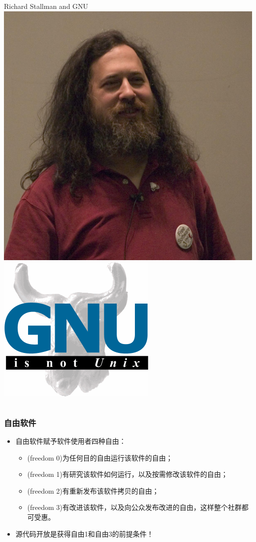 \documentclass[xcolor=svgnames,presentation]{beamer}
\begin{document}
\begin{frame}
\begin{columns}
\begin{column}{0.5\textwidth}
\begin{exampleblock}{Richard Stallman and GNU}
\includegraphics[width=.5\textwidth]{img/stallman.jpg}
\includegraphics[width=.5\textwidth]{img/gnu.jpg}
\end{exampleblock}
\end{column}
\end{columns}
\end{frame}
\begin{frame}
\frametitle{自由软件}
\label{sec-2-2-4}
\begin{itemize}

\item 自由软件赋予软件使用者四种自由：
\label{sec-2-2-4-1}%
\begin{itemize}

\item (freedom 0)为任何目的自由运行该软件的自由；
\label{sec-2-2-4-1-1}%

\item (freedom 1)有研究该软件如何运行，以及按需修改该软件的自由；
\label{sec-2-2-4-1-2}%

\item (freedom 2)有重新发布该软件拷贝的自由；
\label{sec-2-2-4-1-3}%

\item (freedom 3)有改进该软件，以及向公众发布改进的自由，这样整个社群都可受惠。
\label{sec-2-2-4-1-4}%
\end{itemize} %

\item 源代码开放是获得自由1和自由3的前提条件！
\label{sec-2-2-4-2}%
\end{itemize} %
\end{frame}
\end{document}

